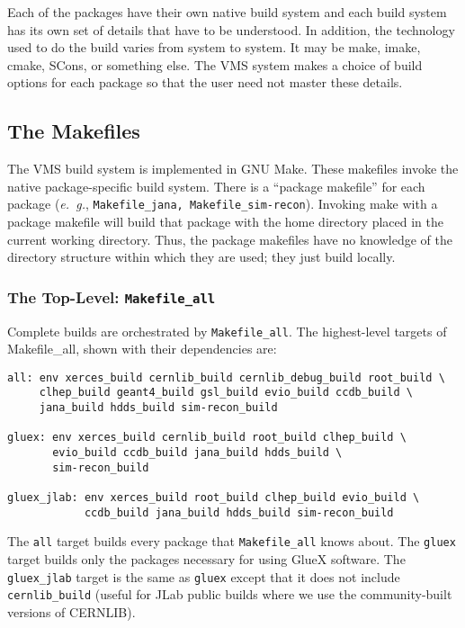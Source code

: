 \documentclass[12pt]{article}
\begin{document}
Each of the packages have their own native build system and each build
system has its own set of details that have to be understood. In
addition, the technology used to do the build varies from system to
system. It may be make, imake, cmake, SCons, or something else. The
VMS system makes a choice of build options for each package so that
the user need not master these details.

\subsection{The Makefiles}

The VMS build system is implemented in GNU Make. These makefiles
invoke the native package-specific build system. There is a ``package
makefile'' for each package ({\it e.~g.}, {\tt Makefile\_jana,
  Makefile\_sim-recon}). Invoking make with a package makefile will
build that package with the home directory placed in the current
working directory. Thus, the package makefiles have no knowledge of
the directory structure within which they are used; they just build
locally.

\subsubsection{The Top-Level: {\tt Makefile\_all}}

Complete builds are orchestrated by {\tt Makefile\_all}. The highest-level
targets of Makefile\_all, shown with their dependencies are:

\begin{verbatim}
all: env xerces_build cernlib_build cernlib_debug_build root_build \
     clhep_build geant4_build gsl_build evio_build ccdb_build \
     jana_build hdds_build sim-recon_build

gluex: env xerces_build cernlib_build root_build clhep_build \
       evio_build ccdb_build jana_build hdds_build \
       sim-recon_build

gluex_jlab: env xerces_build root_build clhep_build evio_build \
            ccdb_build jana_build hdds_build sim-recon_build
\end{verbatim}

The {\tt all} target builds every package that {\tt Makefile\_all} knows
about. The {\tt gluex} target builds only the packages necessary for
using GlueX software. The {\tt gluex\_jlab} target is the same as {\tt gluex}
except that it does not include {\tt cernlib\_build} (useful for JLab public
builds where we use the community-built versions of CERNLIB).
\end{document}

